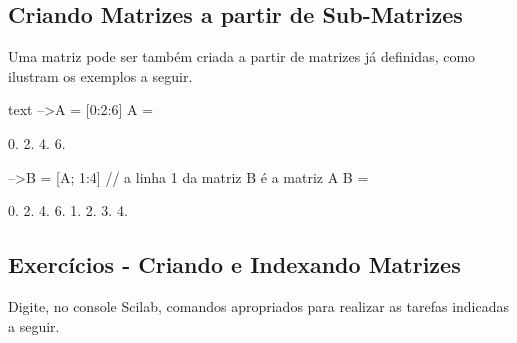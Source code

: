 \documentclass[11pt,fleqn]{practice}
\begin{document}
\subsection{Criando Matrizes a partir de Sub-Matrizes}

Uma matriz pode ser também criada a partir de matrizes já definidas, como ilustram os exemplos a seguir.

\begin{lst}{text}
-->A = [0:2:6]
 A =
 
     0.     2.     4.     6. 
     
-->B = [A; 1:4]          // a linha 1 da matriz B é a matriz A
 B =
 
     0.     2.     4.     6. 
     1.     2.     3.     4.

\end{lst}

\subsection{Exercícios - Criando e Indexando Matrizes}

Digite, no console Scilab, comandos apropriados para realizar as tarefas indicadas a seguir.
\end{document}
